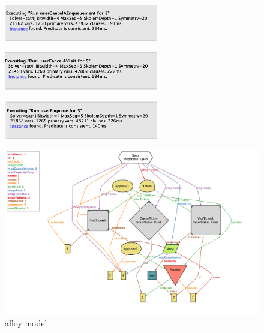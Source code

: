 \begin{figure}[h!]
    \centering
    \includegraphics[width=0.6\textwidth]{Images/alloy/usercancelsanenqueuement.png}
    \caption{\label{fig:usercancelsanenqueuementalloy}}
\end{figure}

\begin{figure}[h!]
    \centering
    \includegraphics[width=0.6\textwidth]{Images/alloy/usercancelsavisit.png}
    \caption{\label{fig:usercancelsavisitalloy}}
\end{figure}

\begin{figure}[h!]
    \centering
    \includegraphics[width=0.6\textwidth]{Images/alloy/userenqueue.png}
    \caption{\label{fig:usernenqueuealloy}}
\end{figure}

\begin{figure}[h!]
    \centering
    \includegraphics[width=\textwidth]{Images/alloy/alloymodel.png}
    \caption{\label{fig:alloymodel}{alloy model}}
\end{figure}

\FloatBarrier